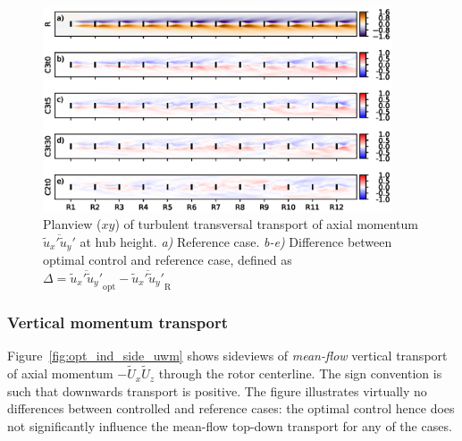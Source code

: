 		\begin{figure}[hbt]
			\centering
			\includegraphics[width=0.92\textwidth]{chapters/optimal_induction_control/topview_uv.eps}
			\caption{Planview ($xy$) of turbulent transversal transport of axial momentum $\overline{\widetilde{u}_x' \widetilde{u}_y'}$ at hub height. \emph{a) } Reference case. \emph{b-e)} Difference between optimal control and reference case, defined as $\Delta = \overline{\widetilde{u}_x' \widetilde{u}_y'}_{\text{opt}} - \overline{\widetilde{u}_x' \widetilde{u}_y'}_{\text{R}}$  \label{fig:opt_ind_top_uv}}
		\end{figure}	
	
		\clearpage
	
	
	\subsubsection{Vertical momentum transport}

	Figure~\ref{fig:opt_ind_side_uwm} shows sideviews of \emph{mean-flow} vertical transport of axial momentum $- \widetilde{U}_x \widetilde{U}_z$ through the rotor centerline. The sign convention is such that downwards transport is positive. The figure illustrates virtually no differences between controlled and reference cases: the optimal control hence does not significantly influence the mean-flow top-down transport for any of the cases.

